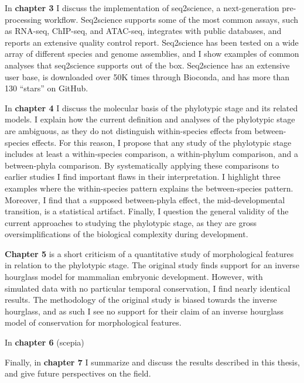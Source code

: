 In \textbf{chapter 3} I discuss the implementation of seq2science, a next-generation pre-processing workflow. Seq2science supports some of the most common assays, such as RNA-seq, ChIP-seq, and ATAC-seq, integrates with public databases, and reports an extensive quality control report. Seq2science has been tested on a wide array of different species and genome assemblies, and I show examples of common analyses that seq2science supports out of the box. Seq2science has an extensive user base\cite{Bright_2021,Xu_2020,Wester2021,SantosBarriopedro2021,Heuts2023,Tholen2023,Harlaar2022,LunaVelez2023,Neikes2023,Vierboom2021,Smits2020,Smits2022,Heuts2022,Rother2023,Ho2023,Sweep2023,vanWigcheren2023,Smits2023}, is downloaded over 50K times through Bioconda, and has more than 130 ``stars'' on GitHub.

In \textbf{chapter 4} I discuss the molecular basis of the phylotypic stage and its related models. I explain how the current definition and analyses of the phylotypic stage are ambiguous, as they do not distinguish within-species effects from between-species effects. For this reason, I propose that any study of the phylotypic stage includes at least a within-species comparison, a within-phylum comparison, and a between-phyla comparison. By systematically applying these comparisons to earlier studies I find important flaws in their interpretation. I highlight three examples where the within-species pattern explains the between-species pattern. Moreover, I find that a supposed between-phyla effect, the mid-developmental transition, is a statistical artifact. Finally, I question the general validity of the current approaches to studying the phylotypic stage, as they are gross oversimplifications of the biological complexity during development.

\textbf{Chapter 5} is a short criticism of a quantitative study of morphological features in relation to the phylotypic stage. The original study finds support for an inverse hourglass model for mammalian embryonic development. However, with simulated data with no particular temporal conservation, I find nearly identical results. The methodology of the original study is biased towards the inverse hourglass, and as such I see no support for their claim of an inverse hourglass model of conservation for morphological features.

In \textbf{chapter 6} (scepia)

Finally, in \textbf{chapter 7} I summarize and discuss the results described in this thesis, and give future perspectives on the field.
